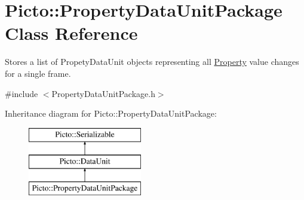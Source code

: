 \hypertarget{class_picto_1_1_property_data_unit_package}{\section{Picto\-:\-:Property\-Data\-Unit\-Package Class Reference}
\label{class_picto_1_1_property_data_unit_package}
}


Stores a list of Propety\-Data\-Unit objects representing all \hyperlink{class_picto_1_1_property}{Property} value changes for a single frame.  




{\ttfamily \#include $<$Property\-Data\-Unit\-Package.\-h$>$}

Inheritance diagram for Picto\-:\-:Property\-Data\-Unit\-Package\-:\begin{figure}[H]
\begin{center}
\leavevmode
\includegraphics[height=3.000000cm]{class_picto_1_1_property_data_unit_package}
\end{center}
\end{figure}
